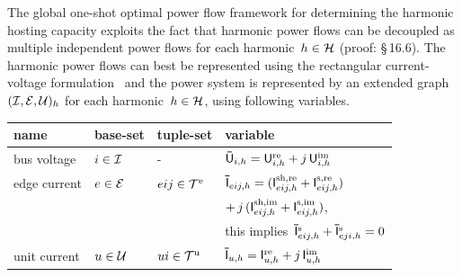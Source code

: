 The global one-shot optimal power flow framework for determining the harmonic hosting capacity exploits the fact that harmonic power flows can be decoupled as multiple independent power flows for each harmonic~$h \in \mathcal{H}$ (proof: \cite{nilsson_electric_2015} \S\,16.6). The harmonic power flows can best be represented using the rectangular current-voltage formulation~\cite{geth_pitfalls_2023} and the power system is represented by an extended graph~$(\mathcal{I},\mathcal{E},\mathcal{U})_{h}$ for each harmonic~$h \in \mathcal{H}$, using following variables.
\begin{table}[ht!]
    \centering
    \begin{tabular}{ l l l l }
        name            & base-set                & tuple-set                                 & variable \\ \midrule
        bus voltage     & $i \in \mathcal{I}$    & -                                         & $\mathsf{\bar{U}}_{i,h} = \mathsf{U}^{\text{re}}_{i,h} + j\,\mathsf{U}^{\text{im}}_{i,h}$ \\
        edge current    & $e \in \mathcal{E}$    & $eij \in \mathcal{T}^{\text{e}}$            & $\mathsf{\bar{I}}_{eij,h}  = (\mathsf{I}^{\text{sh,re}}_{eij,h} + \mathsf{I}^{\text{s,re}}_{eij,h})$ \\
                        &                         &                                           & 
        \qquad\qquad$+\,j\,(\mathsf{I}^{\text{sh,im}}_{eij,h} + \mathsf{I}^{\text{s,im}}_{eij,h})$, \\
                        &                         &                                           & this implies~$\mathsf{\bar{I}}^{\text{s}}_{eij,h}+\mathsf{\bar{I}}^{\text{s}}_{eji,h}=0$ \\
        unit current    & $u \in \mathcal{U}$    & $ui \in \mathcal{T}^{\text{u}}$            & $\mathsf{\bar{I}}_{u,h} = \mathsf{I}^{\text{re}}_{u,h} + j\,\mathsf{I}^{\text{im}}_{u,h}$
    \end{tabular}
\end{table}

